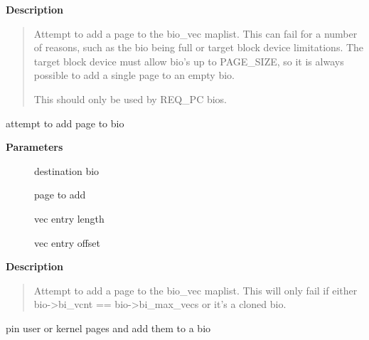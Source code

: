 \documentclass[a4paper,8pt,english]{sphinxmanual}
\begin{document}
\textbf{Description}
\begin{quote}

Attempt to add a page to the bio\_vec maplist. This can fail for a
number of reasons, such as the bio being full or target block device
limitations. The target block device must allow bio's up to PAGE\_SIZE,
so it is always possible to add a single page to an empty bio.

This should only be used by REQ\_PC bios.
\end{quote}

\begin{fulllineitems}
\label{filesystems/index:c.bio_add_page}
attempt to add page to bio

\end{fulllineitems}


\textbf{Parameters}
\begin{description}
\item[{}] \leavevmode
destination bio

\item[{}] \leavevmode
page to add

\item[{}] \leavevmode
vec entry length

\item[{}] \leavevmode
vec entry offset

\end{description}

\textbf{Description}
\begin{quote}

Attempt to add a page to the bio\_vec maplist. This will only fail
if either bio-\textgreater{}bi\_vcnt == bio-\textgreater{}bi\_max\_vecs or it's a cloned bio.
\end{quote}

\begin{fulllineitems}
\label{filesystems/index:c.bio_iov_iter_get_pages}
pin user or kernel pages and add them to a bio

\end{fulllineitems}
\end{document}
